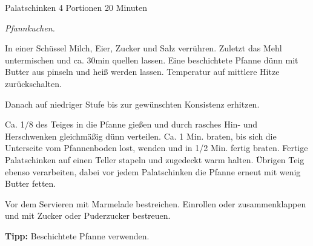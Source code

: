 \begin{recipe}{Palatschinken} {4 Portionen} {20 Minuten}

  \freeform
  \textit{Pfannkuchen.}
  

  In einer Schüssel Milch, Eier, Zucker und Salz verrühren.
  Zuletzt das Mehl untermischen und ca. 30min quellen lassen.
  Eine beschichtete Pfanne dünn mit Butter aus pinseln und heiß werden lassen.
  Temperatur auf mittlere Hitze zurückschalten.

  \newstep
  Danach auf niedriger Stufe bis zur gewünschten Konsistenz erhitzen.

  \newstep
  Ca. 1/8 des Teiges in die Pfanne gießen und durch rasches Hin- und Herschwenken gleichmäßig dünn verteilen.
  Ca. 1 Min. braten, bis sich die Unterseite vom Pfannenboden lost, wenden und in 1/2 Min. fertig braten.
  Fertige Palatschinken auf einen Teller stapeln und zugedeckt warm halten.
  Übrigen Teig ebenso verarbeiten, dabei vor jedem Palatschinken die Pfanne erneut mit wenig Butter fetten.

  \newstep
  Vor dem Servieren mit Marmelade bestreichen.
  Einrollen oder zusammenklappen und mit Zucker oder Puderzucker bestreuen.
  
  \freeform
  \hrulefill
  
  \freeform
  \textbf{Tipp:}
  Beschichtete Pfanne verwenden.
  
  \end{recipe}
  